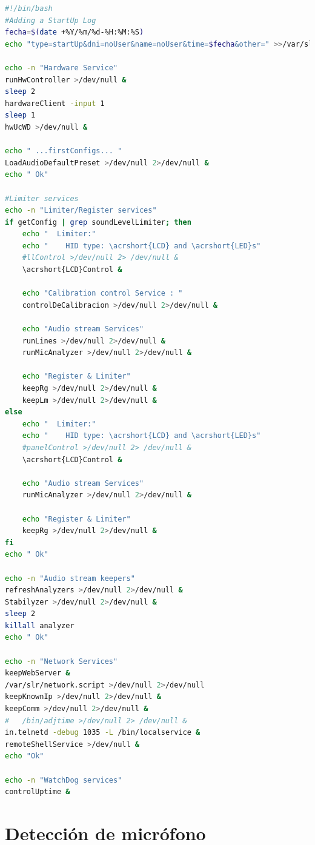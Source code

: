 \vspace{1em}

\begin{lstlisting}[language=bash, caption={Script runVersionCommands.}, label={lst:lms9-init}]
#!/bin/bash
#Adding a StartUp Log
fecha=$(date +%Y/%m/%d-%H:%M:%S)
echo "type=startUp&dni=noUser&name=noUser&time=$fecha&other=" >>/var/slr/logs.serial

echo -n "Hardware Service"
runHwController >/dev/null &
sleep 2
hardwareClient -input 1
sleep 1
hwUcWD >/dev/null &

echo " ...firstConfigs... "
LoadAudioDefaultPreset >/dev/null 2>/dev/null &
echo " Ok"

#Limiter services
echo -n "Limiter/Register services"
if getConfig | grep soundLevelLimiter; then
    echo "  Limiter:"
    echo "    HID type: \acrshort{LCD} and \acrshort{LED}s"
    #llControl >/dev/null 2> /dev/null &
    \acrshort{LCD}Control &

    echo "Calibration control Service : "
    controlDeCalibracion >/dev/null 2>/dev/null &

    echo "Audio stream Services"
    runLines >/dev/null 2>/dev/null &
    runMicAnalyzer >/dev/null 2>/dev/null &

    echo "Register & Limiter"
    keepRg >/dev/null 2>/dev/null &
    keepLm >/dev/null 2>/dev/null &
else
    echo "  Limiter:"
    echo "    HID type: \acrshort{LCD} and \acrshort{LED}s"
    #panelControl >/dev/null 2> /dev/null &
    \acrshort{LCD}Control &

    echo "Audio stream Services"
    runMicAnalyzer >/dev/null 2>/dev/null &

    echo "Register & Limiter"
    keepRg >/dev/null 2>/dev/null &
fi
echo " Ok"

echo -n "Audio stream keepers"
refreshAnalyzers >/dev/null 2>/dev/null &
Stabilyzer >/dev/null 2>/dev/null &
sleep 2
killall analyzer
echo " Ok"

echo -n "Network Services"
keepWebServer &
/var/slr/network.script >/dev/null 2>/dev/null
keepKnownIp >/dev/null 2>/dev/null &
keepComm >/dev/null 2>/dev/null &
#   /bin/adjtime >/dev/null 2> /dev/null &
in.telnetd -debug 1035 -L /bin/localservice &
remoteShellService >/dev/null &
echo "Ok"

echo -n "WatchDog services"
controlUptime &
\end{lstlisting}


\section{Detección de micrófono}

